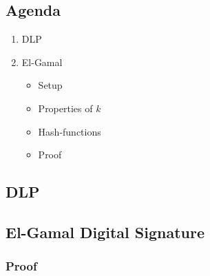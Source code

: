 

\subsection*{Agenda}
\begin{enumerate}
\item DLP
\item El-Gamal
  \begin{itemize}
  \item Setup
  \item Properties of $k$
  \item Hash-functions
  \item Proof
  \end{itemize}
\end{enumerate}

\subsection{DLP}


\subsection{El-Gamal Digital Signature}


\subsubsection*{Proof}

